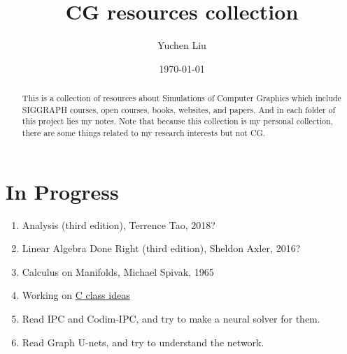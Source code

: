 \documentclass{article}
\title{CG resources collection}
\author{Yuchen Liu}
\date{\today}
\begin{document}
\setcounter{section}{-1}
\maketitle
\tableofcontents

\begin{abstract}
    This is a collection of resources about Simulations of Computer Graphics which include SIGGRAPH courses, open courses, books, websites, and papers. And in each folder of this project lies my notes. Note that because this collection is my personal collection, there are some things related to my research interests but not CG.
\end{abstract}

\section{In Progress}
\begin{enumerate}
    \item Analysis (third edition), Terrence Tao, 2018?
    \item Linear Algebra Done Right (third edition), Sheldon Axler, 2016?
    \item Calculus on Manifolds, Michael Spivak, 1965
    \item Working on \href{https://hlxy-420.github.io/c-class-ideas}{C class ideas}
    \item Read IPC and Codim-IPC, and try to make a neural solver for them.
    \item Read Graph U-nets, and try to understand the network.
\end{enumerate}

\newpage
\end{document}
